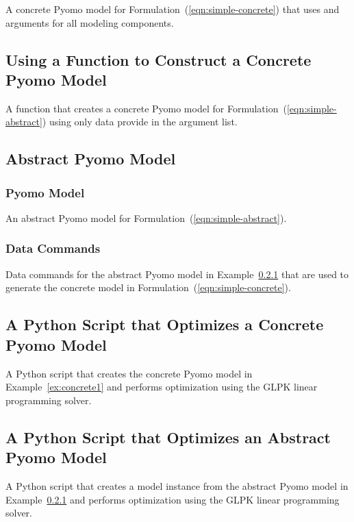 \begin{subappendices}
A concrete Pyomo model for Formulation~(\ref{eqn:simple-concrete}) that uses  and  arguments for
all modeling components.


\subsection{Using a Function to Construct a Concrete Pyomo Model}
\label{ex:abstract4}

A function that creates a concrete Pyomo model for Formulation~(\ref{eqn:simple-abstract}) using only data provide in the argument list.


\subsection{Abstract Pyomo Model}

\subsubsection{Pyomo Model}
\label{ex:abstract5}

An abstract Pyomo model for Formulation~(\ref{eqn:simple-abstract}).


\subsubsection{Data Commands}
\label{ex:abstract5.dat}

Data commands for the abstract Pyomo model in Example~\ref{ex:abstract5} that are used to generate the concrete model in Formulation~(\ref{eqn:simple-concrete}).


\subsection{A Python Script that Optimizes a Concrete Pyomo Model}
\label{ex:script1}

A Python script that creates the concrete Pyomo model in Example~\ref{ex:concrete1} and performs optimization using the GLPK linear programming solver.


\subsection{A Python Script that Optimizes an Abstract Pyomo Model}
\label{ex:script2}

A Python script that creates a model instance from the abstract Pyomo model in Example~\ref{ex:abstract5} and performs optimization using the GLPK linear programming solver.


\end{subappendices}
